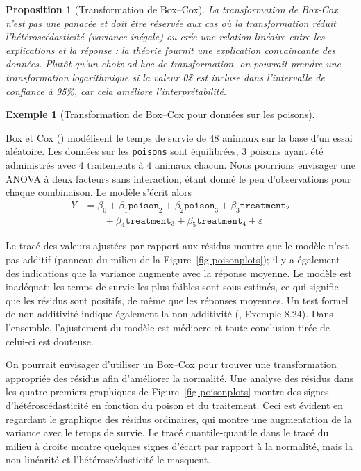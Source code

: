 \documentclass[
  11pt,
  letterpaper,
]{scrbook}
\theoremstyle{plain}
\newtheorem{proposition}{Proposition}[chapter]
\theoremstyle{definition}
\newtheorem{example}{Exemple}[chapter]
\theoremstyle{plain}
\theoremstyle{definition}
\theoremstyle{remark}
\begin{document}
\begin{proposition}[Transformation de
Box--Cox]
La transformation de Box-Cox n'est pas une panacée et doit être réservée
aux cas où la transformation réduit l'hétéroscédasticité (variance
inégale) ou crée une relation linéaire entre les explications et la
réponse : la théorie fournit une explication convaincante des données.
Plutôt qu'un choix \emph{ad hoc} de transformation, on pourrait prendre
une transformation logarithmique si la valeur 0\$ est incluse dans
l'intervalle de confiance à 95\%, car cela améliore l'interprétabilité.

\end{proposition}

\begin{example}[Transformation de Box--Cox pour données sur les
poisons]\protect\hypertarget{exm-poisonboxcox}{}\label{exm-poisonboxcox}

Box et Cox () modélisent le temps de
survie de 48 animaux sur la base d'un essai aléatoire. Les données sur
les \texttt{poisons} sont équilibrées, 3 poisons ayant été administrés
avec 4 traitements à 4 animaux chacun. Nous pourrions envisager une
ANOVA à deux facteurs sans interaction, étant donné le peu
d'observations pour chaque combinaison. Le modèle s'écrit alors
\begin{align*}
Y &= \beta_0 + \beta_1 \texttt{poison}_2 + \beta_2\texttt{poison}_3  +\beta_3\texttt{treatment}_2 \\ &\qquad+ \beta_4\texttt{treatment}_3
+\beta_5\texttt{treatment}_4 + \varepsilon
\end{align*}

Le tracé des valeurs ajustées par rapport aux résidus montre que le
modèle n'est pas additif (panneau du milieu de la
Figure~\ref{fig-poisonplots}); il y a également des indications que la
variance augmente avec la réponse moyenne. Le modèle est inadéquat: les
temps de survie les plus faibles sont sous-estimés, ce qui signifie que
les résidus sont positifs, de même que les réponses moyennes. Un test
formel de non-additivité indique également la non-additivité
(, Exemple 8.24). Dans
l'ensemble, l'ajustement du modèle est médiocre et toute conclusion
tirée de celui-ci est douteuse.

On pourrait envisager d'utiliser un Box--Cox pour trouver une
transformation appropriée des résidus afin d'améliorer la normalité. Une
analyse des résidus dans les quatre premiers graphiques de
Figure~\ref{fig-poisonplots} montre des signes d'hétéroscédasticité en
fonction du poison et du traitement. Ceci est évident en regardant le
graphique des résidus ordinaires, qui montre une augmentation de la
variance avec le temps de survie. Le tracé quantile-quantile dans le
tracé du milieu à droite montre quelques signes d'écart par rapport à la
normalité, mais la non-linéarité et l'hétéroscédasticité le masquent.


\end{example}
\end{document}
